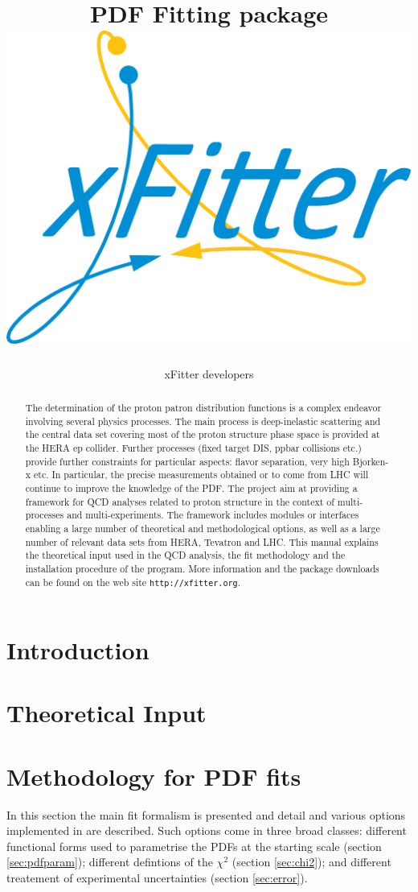 \documentclass[11pt,twoside,a4paper]{article}
\title{ \vspace{1cm} {\Huge \fitter\ } \\
              PDF Fitting package  \\ 
              \vspace{0.5cm}
\includegraphics[width=0.25\linewidth]{figures/xFitterLogo.pdf}}
\author{xFitter developers}
\begin{document}
\maketitle
\vspace{4cm}
\begin{abstract}
\vspace{0.5cm}
The determination of the  proton patron distribution functions is a complex endeavor involving several physics processes. The main process is deep-inelastic scattering and the central  data set covering most of the proton structure phase space is provided at the HERA ep collider. Further processes (fixed target DIS, ppbar collisions etc.) provide further constraints for particular aspects: flavor separation, very high Bjorken-x etc. In particular, the precise measurements obtained or to come from LHC will continue to improve the knowledge of the PDF. The \fitter project aim at providing a framework for QCD analyses related to proton structure in the context of multi-processes and multi-experiments. The framework includes modules or interfaces enabling a large number of theoretical and methodological options, as well as a large number of relevant data sets from HERA, Tevatron and LHC. This manual explains the theoretical input used in the QCD analysis, the fit  methodology and the installation procedure of the program. More information and the package downloads can be found on the web site {\tt http://xfitter.org}.
\end{abstract}
\thispagestyle{empty}
\newpage
\tableofcontents
\newpage
\section{Introduction}
  
\section{Theoretical Input}


\section{Methodology for PDF fits}
In this section the main fit formalism is presented and 
detail and various options implemented in \fitter are described. 
Such options come in three broad classes: different functional forms
used to 
parametrise the PDFs at the starting scale (section \ref{sec:pdfparam});
different defintions of the $\chi^2$ (section \ref{sec:chi2}); 
and different treatement of experimental uncertainties (section \ref{sec:error}).
\end{document}
